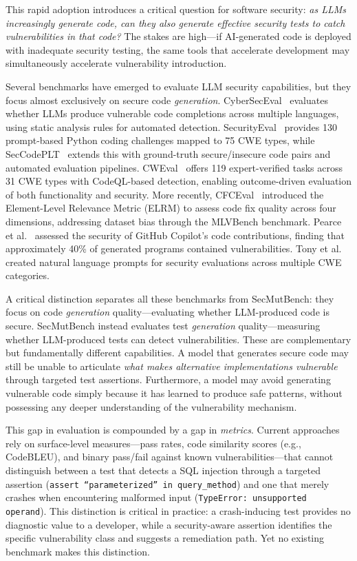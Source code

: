 \documentclass[sigconf,anonymous,review]{acmart}
\begin{document}
This rapid adoption introduces a critical question for software security: \emph{as LLMs increasingly generate code, can they also generate effective security tests to catch vulnerabilities in that code?} The stakes are high---if AI-generated code is deployed with inadequate security testing, the same tools that accelerate development may simultaneously accelerate vulnerability introduction.

Several benchmarks have emerged to evaluate LLM security capabilities, but they focus almost exclusively on secure code \emph{generation}. CyberSecEval~\cite{bhatt2023cyberseceval} evaluates whether LLMs produce vulnerable code completions across multiple languages, using static analysis rules for automated detection. SecurityEval~\cite{siddiq2022securityeval} provides 130 prompt-based Python coding challenges mapped to 75 CWE types, while SecCodePLT~\cite{secccodeplt2024} extends this with ground-truth secure/insecure code pairs and automated evaluation pipelines. CWEval~\cite{yang2024cweval} offers 119 expert-verified tasks across 31 CWE types with CodeQL-based detection, enabling outcome-driven evaluation of both functionality and security. More recently, CFCEval~\cite{cheng2025cfceval} introduced the Element-Level Relevance Metric (ELRM) to assess code fix quality across four dimensions, addressing dataset bias through the MLVBench benchmark. Pearce et al.~\cite{pearce2022asleep} assessed the security of GitHub Copilot's code contributions, finding that approximately 40\% of generated programs contained vulnerabilities. Tony et al.~\cite{tony2023llmseceval} created natural language prompts for security evaluations across multiple CWE categories.

A critical distinction separates all these benchmarks from SecMutBench: they focus on code \emph{generation} quality---evaluating whether LLM-produced code is secure. SecMutBench instead evaluates test \emph{generation} quality---measuring whether LLM-produced tests can detect vulnerabilities. These are complementary but fundamentally different capabilities. A model that generates secure code may still be unable to articulate \emph{what makes alternative implementations vulnerable} through targeted test assertions. Furthermore, a model may avoid generating vulnerable code simply because it has learned to produce safe patterns, without possessing any deeper understanding of the vulnerability mechanism.

This gap in evaluation is compounded by a gap in \emph{metrics}. Current approaches rely on surface-level measures---pass rates, code similarity scores (e.g., CodeBLEU), and binary pass/fail against known vulnerabilities---that cannot distinguish between a test that detects a SQL injection through a targeted assertion (\texttt{assert ``parameterized'' in query\_method}) and one that merely crashes when encountering malformed input (\texttt{TypeError: unsupported operand}). This distinction is critical in practice: a crash-inducing test provides no diagnostic value to a developer, while a security-aware assertion identifies the specific vulnerability class and suggests a remediation path. Yet no existing benchmark makes this distinction.
\end{document}
